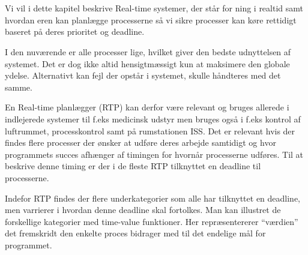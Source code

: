 \chapter{\ds}
Vi vil i dette kapitel beskrive Real-time systemer, der står for \sched ning i realtid samt  hvordan \sched eren kan planlægge processerne så vi sikre processer kan køre rettidigt baseret på deres prioritet og deadline.

I den nuværende \csp er alle processer lige, hvilket giver den bedste udnyttelsen af systemet. Det er dog ikke altid hensigtmæssigt kun at maksimere den globale ydelse. Alternativt kan fejl der opstår i systemet, skulle håndteres med det samme. 

En Real-time planlægger (RTP) kan derfor være relevant og bruges allerede i  indlejerede systemer til f.eks medicinsk udstyr men bruges også i f.eks kontrol af luftrummet,  processkontrol samt på rumstationen ISS\cite{Audsley1990}. Det er  relevant  hvis der findes flere processer der ønsker at udføre deres arbejde samtidigt og hvor programmets succes afhænger af timingen for hvornår processerne udføres. Til at beskrive denne timing er der i de fleste RTP tilknyttet en deadline til processerne.

Indefor RTP findes der flere underkategorier som alle har tilknyttet en deadline, men varrierer i hvordan denne deadline skal fortolkes. Man kan illustret de forskellige kategorier med time-value funktioner. Her repræsentererer ``værdien'' det fremskridt den enkelte proces bidrager med til det endelige mål for programmet.


